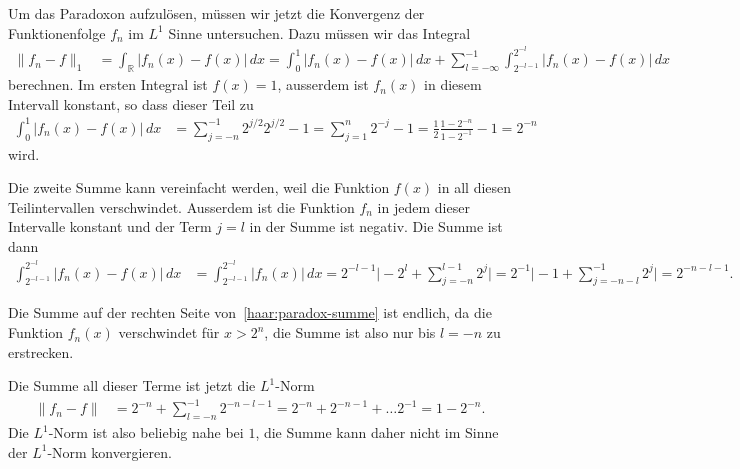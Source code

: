 Um das Paradoxon aufzulösen, müssen wir jetzt die Konvergenz der
Funktionenfolge $f_n$ im $L^1$ Sinne untersuchen.
Dazu müssen wir das Integral
\begin{align}
\| f_n-f\|_1
&=
\int_{\mathbb R} |f_n(x) - f(x)| \,dx
=
\int_0^1 |f_n(x) - f(x)|\,dx
+
\sum_{l=-\infty}^{-1}
\int_{2^{-l-1}}^{2^{-l}} |f_n(x)-f(x)|\,dx
\label{haar:paradox-summe}
\end{align}
berechnen.
Im ersten Integral ist $f(x)=1$, ausserdem ist $f_n(x)$ in diesem Intervall
konstant, so dass dieser Teil zu
\begin{align*}
\int_0^1 |f_n(x) - f(x)|\,dx
&=
\sum_{j=-n}^{-1} 2^{j/2} 2^{j/2} - 1
=
\sum_{j=1}^{n} 2^{-j} - 1
=
\frac12
\frac{1-2^{-n}}{1-2^{-1}}-1
=
2^{-n}
\end{align*}
wird.

Die zweite Summe kann vereinfacht werden, weil die Funktion $f(x)$ in all
diesen Teilintervallen verschwindet.
Ausserdem ist die Funktion $f_n$ in jedem dieser Intervalle konstant
und der Term $j=l$ in der Summe ist negativ.
Die Summe ist dann
\begin{align*}
\int_{2^{-l-1}}^{2^{-l}} |f_n(x)-f(x)|\,dx
&=
\int_{2^{-l-1}}^{2^{-l}} |f_n(x)|\,dx
=
2^{-l-1} 
\biggl|
-2^{l}
+
\sum_{j=-n}^{l-1}  2^{j}
\biggr|
=
2^{-1} 
\biggl|
-1
+
\sum_{j=-n-l}^{-1}  2^{j}
\biggr|
=
2^{-n-l-1}.
\end{align*}

Die Summe auf der rechten Seite von~\eqref{haar:paradox-summe} ist
endlich, da die Funktion $f_n(x)$ verschwindet für $x>2^n$, die Summe
ist also nur bis $l=-n$ zu erstrecken.

Die Summe all dieser Terme ist jetzt die $L^1$-Norm
\begin{align*}
\|f_n - f\|
&=
2^{-n} + \sum_{l=-n}^{-1} 2^{-n-l-1}
=
2^{-n} + 2^{-n-1} + \dots 2^{-1}
=
1- 2^{-n}.
\end{align*}
Die $L^1$-Norm ist also beliebig nahe bei $1$, die Summe kann daher
nicht im Sinne der $L^1$-Norm konvergieren.

